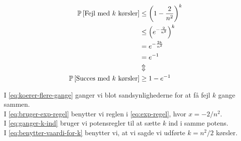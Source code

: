 \begin{align}
  \mathbb{P} \left[  \text{Fejl med $k$ kørsler}  \right]
  &\leq \left(  1 - \frac{2}{n^2}  \right)^k \label{eq:koerer-flere-gange} \\
  &\leq \left( e^{- \frac{2}{n^2}} \right)^k \label{eq:bruger-exp-regel} \\
  &= e^{- \frac{2k}{n^2}} \label{eq:ganger-k-ind} \\
  &= e^{-1} \label{eq:benytter-vaardi-for-k} \\
  &\Updownarrow \nonumber \\
  \mathbb{P} \left[  \text{Succes med $k$ kørsler}  \right] &\geq 1 - e^{-1} \nonumber
\end{align}

I \cref{eq:koerer-flere-gange} ganger vi blot sandsynlighederne for at få fejl $k$ gange sammen.\\
I \cref{eq:bruger-exp-regel} benytter vi reglen i \cref{eq:exp-regel}, hvor $x = -2/n^2$.\\
I \cref{eq:ganger-k-ind} bruger vi potensregler til at sætte $k$ ind i samme potens.\\
I \cref{eq:benytter-vaardi-for-k} benytter vi, at vi sagde vi udførte $k = n^2/2$ kørsler.




